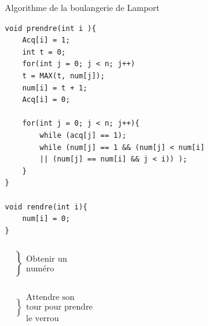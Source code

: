 \begin{algo} \normalfont Algorithme de la boulangerie de Lamport\\
	\begin{minipage}{0.6\linewidth}
		\begin{lstlisting}[style=CStyle]   
void prendre(int i ){
	Acq[i] = 1;
	int t = 0;
	for(int j = 0; j < n; j++)
	t = MAX(t, num[j]);
	num[i] = t + 1;
	Acq[i] = 0;
	
	for(int j = 0; j < n; j++){
		while (acq[j] == 1);
		while (num[j] == 1 && (num[j] < num[i] 
		|| (num[j] == num[i] && j < i)) );
	}
}

void rendre(int i){
	num[i] = 0;
}\end{lstlisting}
	\end{minipage}
	\begin{minipage}{0.25\linewidth}
		$\begin{array}{l}
			\left. \begin{array}{c} \\ \\ \\ \\ \\ \end{array} \right\} \begin{array}{c} \\ \\ \text{Obtenir un} \\\text{numéro} \\ \\ \end{array} \\
			\\
			\left. \begin{array}{c} \\ \\ \\ \\ \end{array} \right\} \begin{array}{c} \\ \text{Attendre son} \\\text{tour pour prendre} \\ \text{le verrou} \\ \end{array}
			\\ \\ \\ \\ \\
		\end{array}
		$
	\end{minipage}
\end{algo}

